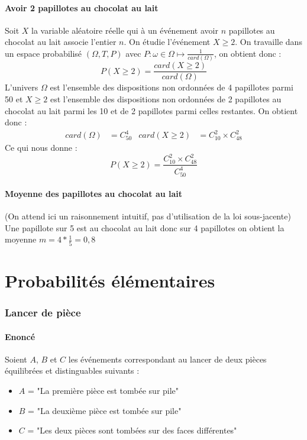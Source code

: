 \documentclass[10pt,a4paper,twoside]{article}
\begin{document}
\subsection{Avoir 2 papillotes au chocolat au lait}
Soit $X$ la variable aléatoire réelle qui à un événement avoir $n$ papillotes au chocolat au lait associe l'entier $n$. On étudie l'événement $X\geqslant 2$. On travaille dans un espace probabilisé $(\Omega,T,P)$ avec $P:\omega\in\Omega\mapsto\frac{1}{card(\Omega)}$, on obtient donc :
$$P(X\geqslant2)=\frac{card(X\geqslant2)}{card(\Omega)}$$
L'univers $\Omega$ est l'ensemble des dispositions non ordonnées de 4 papillotes parmi 50 et $X\geqslant2$ est l'ensemble des dispositions non ordonnées de 2 papillotes au chocolat au lait parmi les 10 et de 2 papillotes parmi celles restantes. On obtient donc :
\begin{align*}
card(\Omega) &=C^{4}_{50} & card(X\geqslant2)&=C^{2}_{10}\times C^{2}_{48} 
\end{align*}
Ce qui nous donne :
\[ P(X\geqslant2)=\frac{C^{2}_{10}\times C^{2}_{48}}{C^{4}_{50}} \]

\subsection{Moyenne des papillotes au chocolat au lait}
(On attend ici un raisonnement intuitif, pas d'utilisation de la loi sous-jacente)\\
Une papillote sur 5 est au chocolat au lait donc sur 4 papillotes on obtient la moyenne $m=4*\frac{1}{5} = 0,8$

\newpage
\part{Probabilités élémentaires}
\setcounter{section}{0}

\section{Lancer de pièce}
\subsection*{Enoncé}
Soient $A$, $B$ et $C$ les événements correspondant au lancer de deux pièces équilibrées et distinguables suivants :
\begin{itemize}
\item $A$ = "La première pièce est tombée sur pile"
\item $B$ = "La deuxième pièce est tombée sur pile"
\item $C$ = "Les deux pièces sont tombées sur des faces différentes"
\end{itemize}
\end{document}
